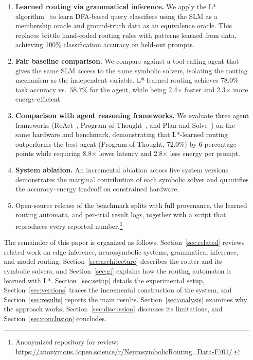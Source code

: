 \documentclass[journal]{IEEEtai}
\begin{document}
\begin{enumerate}
    \item \textbf{Learned routing via grammatical inference.} We apply the L* algorithm~\cite{Angluin87} to learn DFA-based query classifiers using the SLM as a membership oracle and ground-truth data as an equivalence oracle. This replaces brittle hand-coded routing rules with patterns learned from data, achieving 100\% classification accuracy on held-out prompts.
    \item \textbf{Fair baseline comparison.} We compare against a tool-calling agent that gives the same SLM access to the same symbolic solvers, isolating the routing mechanism as the independent variable. L*-learned routing achieves 78.0\% task accuracy vs.\ 58.7\% for the agent, while being 2.4$\times$ faster and 2.3$\times$ more energy-efficient.
    \item \textbf{Comparison with agent reasoning frameworks.} We evaluate three agent frameworks (ReAct~\cite{yao2023react}, Program-of-Thought~\cite{chen2023pot}, and Plan-and-Solve~\cite{wang2023plansolve}) on the same hardware and benchmark, demonstrating that L*-learned routing outperforms the best agent (Program-of-Thought, 72.0\%) by 6 percentage points while requiring 8.8$\times$ lower latency and 2.8$\times$ less energy per prompt.
    \item \textbf{System ablation.} An incremental ablation across five system versions demonstrates the marginal contribution of each symbolic solver and quantifies the accuracy--energy tradeoff on constrained hardware.
    \item Open-source release of the benchmark splits with full provenance, the learned routing automata, and per-trial result logs, together with a script that reproduces every reported number.\footnote{Anonymized repository for review: \url{https://anonymous.4open.science/r/NeurosymbolicRouting_Data-F701/}.}
\end{enumerate}

The remainder of this paper is organized as follows. Section~\ref{sec:related} reviews related work on edge inference, neurosymbolic systems, grammatical inference, and model routing. Section~\ref{sec:architecture} describes the router and its symbolic solvers, and Section~\ref{sec:gi} explains how the routing automaton is learned with L*. Section~\ref{sec:setup} details the experimental setup, Section~\ref{sec:versions} traces the incremental construction of the system, and Section~\ref{sec:results} reports the main results. Section~\ref{sec:analysis} examines why the approach works, Section~\ref{sec:discussion} discusses its limitations, and Section~\ref{sec:conclusion} concludes.
\end{document}
